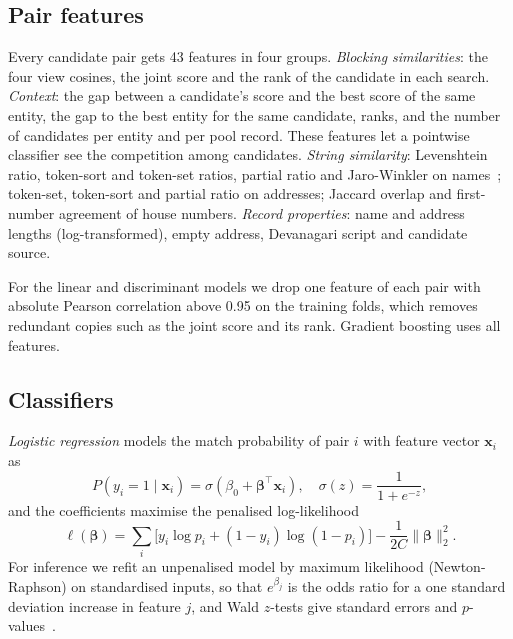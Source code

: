 \subsection{Pair features}
Every candidate pair gets 43 features in four groups. \emph{Blocking similarities}: the four view cosines, the
joint score and the rank of the candidate in each search. \emph{Context}: the gap between a candidate's score and
the best score of the same entity, the gap to the best entity for the same candidate, ranks, and the number of
candidates per entity and per pool record. These features let a pointwise classifier see the competition among
candidates. \emph{String similarity}: Levenshtein ratio, token-sort and token-set ratios, partial ratio and
Jaro-Winkler on names~\cite{cohen2003,winkler1990}; token-set, token-sort and partial ratio on addresses; Jaccard
overlap and first-number agreement of house numbers. \emph{Record properties}: name and address lengths
(log-transformed), empty address, Devanagari script and candidate source.

For the linear and discriminant models we drop one feature of each pair with absolute Pearson correlation above 0.95
on the training folds, which removes redundant copies such as the joint score and its rank. Gradient boosting uses
all features.

\subsection{Classifiers}
\emph{Logistic regression} models the match probability of pair $i$ with feature vector $\mathbf{x}_i$ as
\begin{equation}
P(y_i=1\mid\mathbf{x}_i)=\sigma(\beta_0+\boldsymbol{\beta}^{\top}\mathbf{x}_i),\quad \sigma(z)=\frac{1}{1+e^{-z}},
\end{equation}
and the coefficients maximise the penalised log-likelihood
\begin{equation}
\ell(\boldsymbol\beta)=\sum_i\big[y_i\log p_i+(1-y_i)\log(1-p_i)\big]-\frac{1}{2C}\lVert\boldsymbol\beta\rVert_2^2 .
\end{equation}
For inference we refit an unpenalised model by maximum likelihood (Newton-Raphson) on standardised inputs, so that
$e^{\beta_j}$ is the odds ratio for a one standard deviation increase in feature $j$, and Wald $z$-tests give
standard errors and $p$-values~\cite{hosmer2013}.

